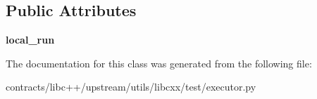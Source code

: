 \subsection*{Public Attributes}
\begin{DoxyCompactItemize}
\item 
\mbox{\label{classlibcxx_1_1test_1_1executor_1_1_remote_executor_a30fdd6710c1858b1af79341e9f4324cd}} 
{\bfseries local\+\_\+run}
\end{DoxyCompactItemize}


The documentation for this class was generated from the following file\+:\begin{DoxyCompactItemize}
\item 
contracts/libc++/upstream/utils/libcxx/test/executor.\+py\end{DoxyCompactItemize}
